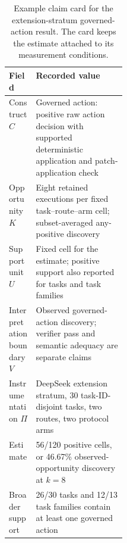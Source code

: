 \begin{table}[H]
\centering
\caption{Example claim card for the extension-stratum governed-action result. The card keeps the estimate attached to its measurement conditions.}
\label{tab:claim-card}
\small
\begin{tabularx}{\linewidth}{@{}L{0.23\linewidth}Y@{}}
\toprule
Field & Recorded value \\
\midrule
Construct $C$ & Governed action: positive raw action decision with supported deterministic application and patch-application check \\
Opportunity $K$ & Eight retained executions per fixed task--route--arm cell; subset-averaged any-positive discovery \\
Support unit $U$ & Fixed cell for the estimate; positive support also reported for tasks and task families \\
Interpretation boundary $V$ & Observed governed-action discovery; verifier pass and semantic adequacy are separate claims \\
Instrumentation $\Pi$ & DeepSeek extension stratum, 30 task-ID-disjoint tasks, two routes, two protocol arms \\
Estimate & 56/120 positive cells, or 46.67\% observed-opportunity discovery at $k=8$ \\
Broader support & 26/30 tasks and 12/13 task families contain at least one governed action \\
\bottomrule
\end{tabularx}
\end{table}
